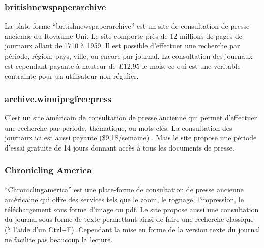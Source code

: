         \subsubsection{britishnewspaperarchive}
        \label{subsubsec:britishnewspaper}
        La plate-forme “britishnewspaperarchive” est un site de consultation de presse ancienne du Royaume Uni.
        Le site comporte près de 12 millions de pages de journaux allant de 1710 à 1959. Il est possible
        d’effectuer une recherche par période, région, pays, ville, ou encore par journal. La consultation
        des journaux est cependant payante à hauteur de £12,95 le mois, ce qui est une véritable contrainte
        pour un utilisateur non régulier.

        \subsubsection{archive.winnipegfreepress}
        \label{subsubsec:winnipeg}
        C’est un site américain de consultation de presse ancienne qui permet d’effectuer une recherche par période,
        thématique, ou mots clés. La consultation des journaux ici  est aussi payante
        (\$9,18/semaine) . Mais le site propose une période d’essai gratuite de 14 jours donnant accès à tous les documents de presse.

        \subsubsection{Chronicling America}
        \label{subsubsec:chrinamerica}
        “Chroniclingamerica” est une plate-forme de consultation de presse ancienne américaine qui offre des services
        tels que le zoom, le rognage, l’impression, le téléchargement sous forme d’image ou pdf. Le site propose
        aussi une consultation du journal sous forme de texte permettant ainsi de faire une recherche classique
        (à l’aide d’un Ctrl+F). Cependant la mise en forme de la version texte du journal ne facilite pas beaucoup la lecture.

